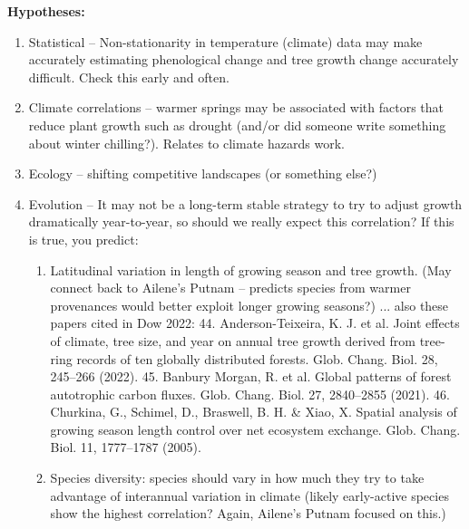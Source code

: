 \documentclass[11pt,letter]{article}
\begin{document}
{\bf Hypotheses:}
\begin{enumerate}
\item Statistical -- Non-stationarity in temperature (climate) data may make accurately estimating phenological change and tree growth change accurately difficult. Check this early and often. 
\item Climate correlations -- warmer springs may be associated with factors that reduce plant growth such as drought (and/or did someone write something about winter chilling?). Relates to climate hazards work. 
\item Ecology -- shifting competitive landscapes (or something else?) 
\item Evolution -- It may not be a long-term stable strategy to try to adjust growth dramatically year-to-year, so should we really expect this correlation? If this is true, you predict:
\begin{enumerate}
\item Latitudinal variation in length of growing season and tree growth. (May connect back to Ailene's Putnam -- predicts species from warmer provenances would better exploit longer growing seasons?)  ... also these papers cited in Dow 2022: 44. Anderson-Teixeira, K. J. et al. Joint effects of climate, tree size, and year on annual tree growth derived from tree-ring records of ten globally distributed forests. Glob. Chang. Biol. 28, 245–266 (2022). 45. Banbury Morgan, R. et al. Global patterns of forest autotrophic carbon fluxes. Glob. Chang. Biol. 27, 2840–2855 (2021). 46. Churkina, G., Schimel, D., Braswell, B. H. \& Xiao, X. Spatial analysis of growing season length control over net ecosystem exchange. Glob. Chang. Biol. 11, 1777–1787 (2005).
\item Species diversity: species should vary in how much they try to take advantage of interannual variation in climate (likely early-active species show the highest correlation? Again, Ailene's Putnam focused on this.)
\end{enumerate}
\end{enumerate}


\end{document}
